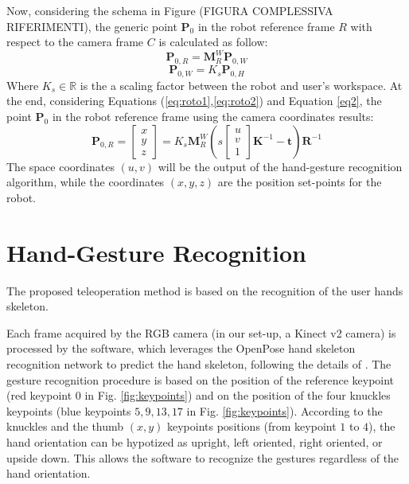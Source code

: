 \documentclass[letterpaper, 10 pt, conference]{ieeeconf}  %
\begin{document}
Now, considering the schema in Figure (FIGURA COMPLESSIVA RIFERIMENTI), the generic point $\mathbf{P}_{0}$ in the robot reference frame $R$ with respect to the camera frame $C$ is calculated as follow:
\begin{equation}\label{eq:roto1}
\mathbf{P}_{0,R} = \mathbf{M}^W_{R}\mathbf{P}_{0,W}
\end{equation}
\begin{equation}\label{eq:roto2}
\mathbf{P}_{0,W} = K_s\mathbf{P}_{0,H}
\end{equation}
Where $K_s\in \mathbb{R}$ is the a scaling factor between the robot and user's workspace. At the end, considering Equations (\ref{eq:roto1},\ref{eq:roto2}) and Equation \ref{eq2}, the point $\mathbf{P}_{0}$ in the robot reference frame using the camera coordinates results:
\begin{equation}
\mathbf{P}_{0,R} = \begin{bmatrix}
x \\
y \\
z
\end{bmatrix}=
K_s\mathbf{M}^W_{R}
\left(s 
\begin{bmatrix}
u \\
v \\
1
\end{bmatrix}
\mathbf{K}^{-1}-\mathbf{t}\right)\mathbf{R}^{-1}
\end{equation}
The space coordinates $(u,v)$ will be the output of the hand-gesture recognition algorithm, while the coordinates $(x,y,z)$ are the position set-points for the robot.

\section{Hand-Gesture Recognition}\label{sec:HG_recon}

The proposed teleoperation method is based on the recognition of the user hands skeleton.

Each frame acquired by the RGB camera (in our set-up, a Kinect v2 camera) is processed by the software, which leverages the OpenPose hand skeleton recognition network to predict the hand skeleton, following the details of \cite{simon2017hand}.
The gesture recognition procedure is based on the position of the reference keypoint (red keypoint $0$ in Fig. \ref{fig:keypoints}) and on the position of the four knuckles keypoints (blue keypoints $5, 9, 13, 17$ in Fig. \ref{fig:keypoints}). According to the knuckles and the thumb $(x, y)$ keypoints positions (from keypoint $1$ to $4$), the hand orientation can be hypotized as upright, left oriented, right oriented, or upside down. This allows the software to recognize the gestures regardless of the hand orientation. %
\end{document}
